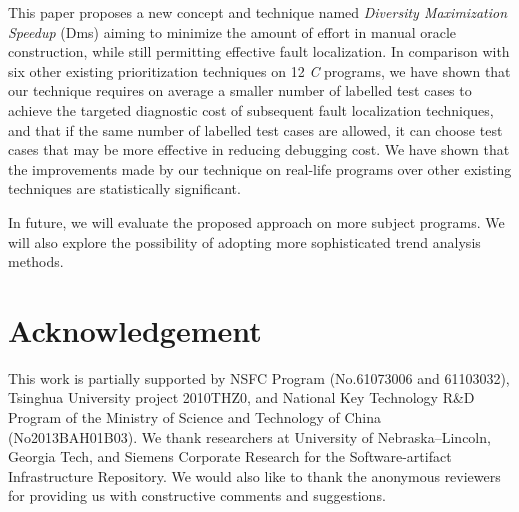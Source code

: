 This paper proposes a new concept and technique named {\em Diversity Maximization Speedup} ({\sc Dms}) aiming to minimize the amount of effort in manual oracle construction, while still permitting effective fault localization. In comparison with six other existing prioritization techniques on 12 {\em C} programs, we have shown that our technique requires on average a smaller number of labelled test cases to achieve the targeted diagnostic cost of subsequent fault localization techniques, and that if the same number of labelled test cases are allowed, it can choose test cases that may be more effective in reducing debugging cost. We have shown that the improvements made by our technique on real-life programs over other existing techniques are statistically significant.

In future, we will evaluate the proposed approach on more subject programs. We will also explore the possibility of adopting more sophisticated trend analysis methods.


\section{Acknowledgement} \label{sec.acknowledgement}
This work is partially supported by NSFC Program (No.61073006 and 61103032), Tsinghua University project 2010THZ0, and National Key Technology R\&D Program of the Ministry of Science and Technology of China (No2013BAH01B03). We thank researchers at University of Nebraska--Lincoln, Georgia Tech, and Siemens Corporate Research for the Software-artifact Infrastructure Repository. We would also like to thank the anonymous reviewers for providing us with constructive comments and suggestions.
